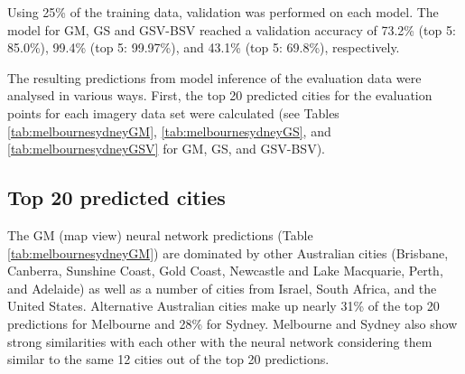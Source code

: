 \documentclass[10pt,letterpaper,hidelinks]{article}
\begin{document}
Using 25\% of the training data, validation was performed on each model. The model for GM, GS and GSV-BSV reached a validation accuracy of 73.2\% (top 5: 85.0\%), 99.4\% (top 5: 99.97\%), and 43.1\% (top 5: 69.8\%), respectively.

The resulting predictions from model inference of the evaluation data were analysed in various ways. First, the top 20 predicted cities for the evaluation points for each imagery data set were calculated (see Tables \ref{tab:melbournesydneyGM}, \ref{tab:melbournesydneyGS}, and \ref{tab:melbournesydneyGSV} for GM, GS, and GSV-BSV).

\subsection*{Top 20 predicted cities} 

The GM (map view) neural network predictions (Table \ref{tab:melbournesydneyGM}) are dominated by other Australian cities (Brisbane, Canberra, Sunshine Coast, Gold Coast, Newcastle and Lake Macquarie, Perth, and Adelaide) as well as a number of cities from Israel, South Africa, and the United States. Alternative Australian cities make up nearly 31\% of the top 20 predictions for Melbourne and 28\% for Sydney. Melbourne and Sydney also show strong similarities with each other with the neural network considering them similar to the same 12 cities out of the top 20 predictions.
\end{document}
